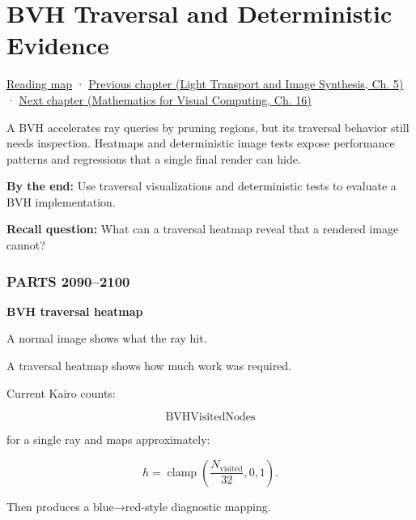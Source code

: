 \chapter{BVH Traversal and Deterministic Evidence}\label{03-visual-computing-i-ch011-bvh-traversal-and-deterministic-evidence}\hypertarget{03-visual-computing-i-ch011}{}\label{stagechapter:03-visual-computing-i-ch011}

\hypertarget{03-visual-computing-i-ch011-bvh-traversal-and-deterministic-evidence}{}

\hyperref[volume-reading-map]{Reading map} · \href{../04-Light-Transport-and-Image-Synthesis/main.pdf\#nameddest=03-visual-computing-i-ch010-a-production-path-tracer-media-randomness-and-validation}{Previous chapter (Light Transport and Image Synthesis, Ch. 5)} · \href{../02-Mathematics-for-Visual-Computing/main.pdf\#nameddest=03-visual-computing-i-ch012-probability-statistics-and-uncertainty}{Next chapter (Mathematics for Visual Computing, Ch. 16)}

A BVH accelerates ray queries by pruning regions, but its traversal behavior still needs inspection. Heatmaps and deterministic image tests expose performance patterns and regressions that a single final render can hide.

\textbf{By the end:} Use traversal visualizations and deterministic tests to evaluate a BVH implementation.

\textbf{Recall question:} What can a traversal heatmap reveal that a rendered image cannot?

\subsection{PARTS 2090--2100}\label{03-visual-computing-i-ch011-parts-20902100}

\hypertarget{03-visual-computing-i-ch011-parts-20902100}{}

\textbf{BVH traversal heatmap}

A normal image shows what the ray hit.

A traversal heatmap shows how much work was required.

Current Kairo counts:

\[
\text{BVHVisitedNodes}
\]

for a single ray and maps approximately:

\[
h=
\operatorname{clamp}
\left(
\frac{
N_{\text{visited}}
}{
32
},
0,1
\right).
\]

Then produces a blue→red-style diagnostic mapping.

